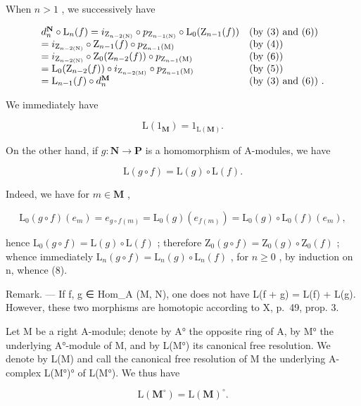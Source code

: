 When \(n > 1\) , we successively have

\[
\begin{array}{l l} d _ {n} ^ {\mathbf {N}} \circ \mathrm{L} _ {n} (f) = i _ {\mathrm{Z} _ {n - 2 (\mathrm{N})}} \circ p _ {\mathrm{Z} _ {n - 1 (\mathrm{N})}} \circ \mathrm{L} _ {0} (\mathrm{Z} _ {n - 1} (f)) & \text {(by (3) and (6))} \\ = i _ {\mathrm{Z} _ {n - 2 (\mathrm{N})}} \circ \mathrm{Z} _ {n - 1} (f) \circ p _ {\mathrm{Z} _ {n - 1} (\mathrm{M})} & \text {(by (4))} \\ = i _ {\mathrm{Z} _ {n - 2 (\mathrm{N})}} \circ \mathrm{Z} _ {0} (\mathrm{Z} _ {n - 2} (f)) \circ p _ {\mathrm{Z} _ {n - 1} (\mathrm{M})} & \text {(by (6))} \\ = \mathrm{L} _ {0} (\mathrm{Z} _ {n - 2} (f)) \circ i _ {\mathrm{Z} _ {n - 2 (\mathrm{M})}} \circ p _ {\mathrm{Z} _ {n - 1} (\mathrm{M})} & \text {(by (5))} \\ = \mathrm{L} _ {n - 1} (f) \circ d _ {n} ^ {\mathbf {M}} & \text {(by (3) and (6)) .} \end{array}
\]

We immediately have

\[
\mathrm{L} (1 _ {\mathbf {M}}) = 1 _ {\mathrm{L} (\mathbf {M})}.\tag{7}
\]

On the other hand, if \(g: \mathbf{N} \to \mathbf{P}\) is a homomorphism of A-modules, we have

\[
\mathrm{L} (g \circ f) = \mathrm{L} (g) \circ \mathrm{L} (f).\tag{8}
\]

Indeed, we have for \(m \in \mathbf{M}\) ,

\[
\mathrm{L} _ {0} (g \circ f) \left(e _ {m}\right) = e _ {g \circ f (m)} = \mathrm{L} _ {0} (g) \left(e _ {f (m)}\right) = \mathrm{L} _ {0} (g) \circ \mathrm{L} _ {0} (f) \left(e _ {m}\right),
\]

hence \(\mathrm{L}_{0}(g\circ f)=\mathrm{L}(g)\circ\mathrm{L}(f)\) ; therefore \(\mathrm{Z}_{0}(g\circ f)=\mathrm{Z}_{0}(g)\circ\mathrm{Z}_{0}(f)\) ; whence immediately \(\mathrm{L}_{n}(g\circ f)=\mathrm{L}_{n}(g)\circ\mathrm{L}_{n}(f)\) , for \(n\geqslant0\) , by induction on n, whence (8).

Remark. --- If f, g ∈ Hom\_A (M, N), one does not have L(f + g) = L(f) + L(g). However, these two morphisms are homotopic according to X, p.~49, prop. 3.

Let M be a right A-module; denote by A° the opposite ring of A, by M° the underlying A°-module of M, and by L(M°) its canonical free resolution. We denote by L(M) and call the canonical free resolution of M the underlying A-complex L(M°)° of L(M°). We thus have

\[
\mathrm{L} (\mathbf {M} ^ {\circ}) = \mathrm{L} (\mathbf {M}) ^ {\circ}.
\]
